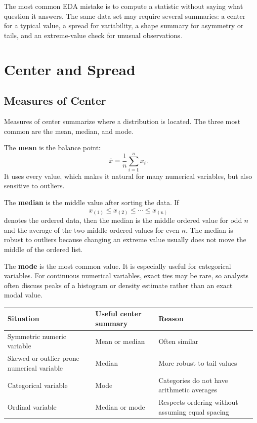 {The most common EDA mistake is to compute a statistic without saying what question it answers.  The same data set may require several summaries: a center for a typical value, a spread for variability, a shape summary for asymmetry or tails, and an extreme-value check for unusual observations.

\section{Center and Spread}

\subsection{Measures of Center}

Measures of center summarize where a distribution is located.  The three most common are the mean, median, and mode.

The \textbf{mean} is the balance point:
\begin{equation}
  \bar{x}=\frac{1}{n}\sum_{i=1}^n x_i.
\end{equation}
It uses every value, which makes it natural for many numerical variables, but also sensitive to outliers.

The \textbf{median} is the middle value after sorting the data.  If
\[
  x_{(1)}\leq x_{(2)}\leq \cdots \leq x_{(n)}
\]
denotes the ordered data, then the median is the middle ordered value for odd $n$ and the average of the two middle ordered values for even $n$.  The median is robust to outliers because changing an extreme value usually does not move the middle of the ordered list.

The \textbf{mode} is the most common value.  It is especially useful for categorical variables.  For continuous numerical variables, exact ties may be rare, so analysts often discuss peaks of a histogram or density estimate rather than an exact modal value.

\begin{center}
\begin{tabular}{@{}>{\raggedright\arraybackslash}p{}>{\raggedright\arraybackslash}p{}>{\raggedright\arraybackslash}p{}@{}}
\hline
Situation & Useful center summary & Reason \\
\hline
Symmetric numeric variable & Mean or median & Often similar \\
Skewed or outlier-prone numerical variable & Median & More robust to tail values \\
Categorical variable & Mode & Categories do not have arithmetic averages \\
Ordinal variable & Median or mode & Respects ordering without assuming equal spacing \\
\hline
\end{tabular}
\end{center}

}
